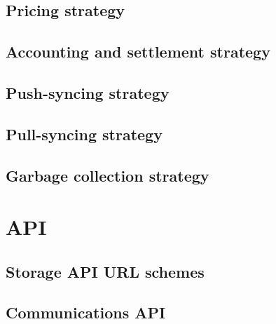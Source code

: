 \section{Pricing strategy}\label{spec:strategy:pricing}

\section{Accounting and settlement strategy}\label{spec:strategy:swap}

\section{Push-syncing strategy}\label{spec:strategy:push-sync}

\section{Pull-syncing strategy}\label{spec:strategy:pull-sync}

\section{Garbage collection strategy}\label{spec:strategy:garbage-collection}

% 
% 

\chapter{API}\label{spec:api}

\red{}

\section{Storage API URL schemes}\label{spec:api:storage}

\section{Communications API}\label{spec:api:communications}

